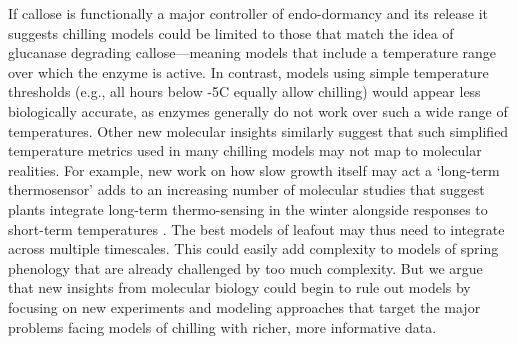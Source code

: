 \documentclass[11pt]{article}
\begin{document}


If callose is functionally a major controller of endo-dormancy and its release it suggests chilling models could be limited to those that match the idea of glucanase degrading callose---meaning models that include a temperature range over which the enzyme is active. In contrast, models using simple temperature thresholds (e.g., all hours below -5\degree C equally allow chilling) would appear less biologically accurate, as enzymes generally do not work over such a wide range of temperatures. Other new molecular insights similarly suggest that such simplified temperature metrics used in many chilling models may not map to molecular realities. For example, new work on how slow growth itself may act  a `long-term thermosensor' \citep{zhao2020temperature} 
adds to an increasing number of molecular studies that suggest plants integrate long-term thermo-sensing in the winter alongside responses to short-term temperatures \citep{antoniou2021feeling,Satake2022}. The best models of leafout may thus need to integrate across multiple timescales. This could easily add complexity to models of spring phenology that are already challenged by too much complexity. But we argue that new insights from molecular biology could begin to rule out models by focusing on new experiments and modeling approaches that target the major problems facing models of chilling with richer, more informative data. 
\end{document}
